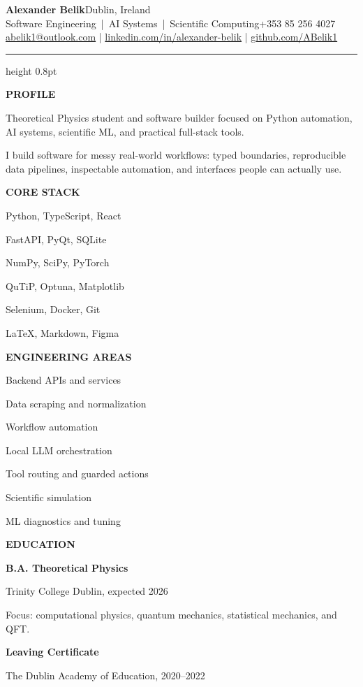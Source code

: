 \documentclass[10pt,a4paper]{article}
\newcommand{\sectiontitle}[1]{%
  \vspace{8.5pt}
  {\small\bfseries\color{accent}\MakeUppercase{#1}}\par
  \vspace{2.5pt}{\color{rule}\hrule height 0.55pt}\vspace{4.8pt}
}
\newcommand{\sideitem}[2]{%
  {\bfseries #1}\par{\small\color{muted}#2}\par\vspace{6pt}
}
\begin{document}
\fontsize{10.0}{12.0}\selectfont
\color{ink}

{\LARGE\bfseries Alexander Belik}\hfill{\small Dublin, Ireland}\\[-1pt]
{\large\color{accent} Software Engineering \,|\, AI Systems \,|\, Scientific Computing}\hfill{\small +353 85 256 4027}\\[3pt]
{\small
\href{mailto:abelik1@outlook.com}{abelik1@outlook.com}
\quad|\quad
\href{https://www.linkedin.com/in/alexander-belik/}{linkedin.com/in/alexander-belik}
\quad|\quad
\href{https://github.com/ABelik1}{github.com/ABelik1}
}
\vspace{7pt}

{\color{rule}\hrule height 0.8pt}
\vspace{8pt}

\begin{minipage}[t][0.835\textheight][t]{0.315\linewidth}
\raggedright

\sectiontitle{Profile}
Theoretical Physics student and software builder focused on Python automation, AI systems, scientific ML, and practical full-stack tools.
\vspace{4pt}

I build software for messy real-world workflows: typed boundaries, reproducible data pipelines, inspectable automation, and interfaces people can actually use.

\sectiontitle{Core Stack}
{\small
Python, TypeScript, React\par
FastAPI, PyQt, SQLite\par
NumPy, SciPy, PyTorch\par
QuTiP, Optuna, Matplotlib\par
Selenium, Docker, Git\par
LaTeX, Markdown, Figma\par
}

\sectiontitle{Engineering Areas}
{\small
Backend APIs and services\par
Data scraping and normalization\par
Workflow automation\par
Local LLM orchestration\par
Tool routing and guarded actions\par
Scientific simulation\par
ML diagnostics and tuning\par
}

\sectiontitle{Education}
\sideitem{B.A. Theoretical Physics}{Trinity College Dublin, expected 2026}
{\small Focus: computational physics, quantum mechanics, statistical mechanics, and QFT.}\par\vspace{5pt}
\sideitem{Leaving Certificate}{The Dublin Academy of Education, 2020--2022}


\end{minipage}
\end{document}
